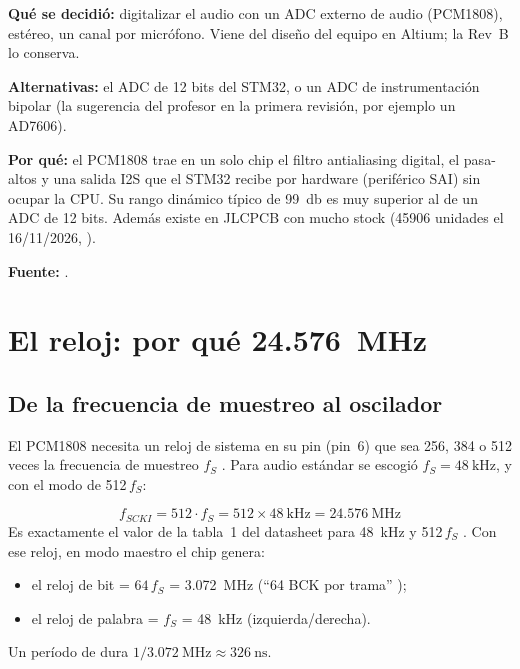 \begin{decision}
\textbf{Qué se decidió:} digitalizar el audio con un ADC externo de audio (PCM1808), estéreo, un canal por micrófono. Viene del diseño del equipo en Altium; la Rev~B lo conserva.

\textbf{Alternativas:} el ADC de 12 bits del STM32, o un ADC de instrumentación bipolar (la sugerencia del profesor en la primera revisión, por ejemplo un AD7606).

\textbf{Por qué:} el PCM1808 trae en un solo chip el filtro antialiasing digital, el pasa-altos y una salida I2S que el STM32 recibe por hardware (periférico SAI) sin ocupar la CPU. Su rango dinámico típico de \SI{99}{\decibel} es muy superior al de un ADC de 12 bits. Además existe en JLCPCB con mucho stock (\num{45906} unidades el 16/11/2026, ).

\textbf{Fuente:} .
\end{decision}

\section{El reloj: por qué \SI{24.576}{\mega\hertz}}\label{sec:c04-reloj}

\subsection{De la frecuencia de muestreo al oscilador}

El PCM1808 necesita un reloj de sistema en su pin  (pin~6) que sea 256, 384 o 512 veces la frecuencia de muestreo $f_S$ . Para audio estándar se escogió $f_S=\SI{48}{\kilo\hertz}$, y con el modo de 512\,$f_S$:

\begin{calculo}
\[
f_{SCKI} = 512 \cdot f_S = 512 \times \SI{48}{\kilo\hertz} = \SI{24.576}{\mega\hertz}
\]
Es exactamente el valor de la tabla~1 del datasheet para 48~kHz y 512\,$f_S$ . Con ese reloj, en modo maestro el chip genera:
\begin{itemize}
  \item el reloj de bit  = $64\,f_S$ = \SI{3.072}{\mega\hertz} (``64 BCK por trama'' );
  \item el reloj de palabra  = $f_S$ = \SI{48}{\kilo\hertz} (izquierda/derecha).
\end{itemize}
Un período de  dura $1/\SI{3.072}{\mega\hertz}\approx\SI{326}{\nano\second}$.
\end{calculo}

